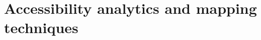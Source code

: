   \section{Accessibility analytics and mapping techniques}
    \label{sec:overv:accss}

%
%
%













